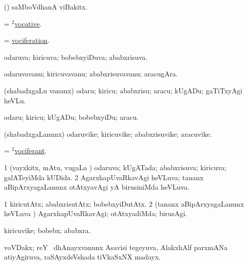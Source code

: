 \bentry 
{} 
\gl{\nA}
\expl{}
\bmng
 (\vAyx) saMboVdhanA viBakitx. 
\emng
\eentry

\bentry 
{}
\gl{\nA}
\expl{}
\bmng
 = \hyperlink{vocative(2)}{$^2$vocative}. 
\emng
\eentry

\bentry
{} 
\gl{\nA}
\expl{}
\bmng
 = \hyperlink{vociferation}{vociferation}. 
\emng
\eentry

\bentry
{} 
\gl{\gu}
\expl{}
\bmng
 odaruva; kiricuva; bobebxyiDuva; ababxrisuva. 
\emng
\eentry

\bentry
{} 
\gl{\nA}
\expl{}
\bmng
 odaruvavanu; kiricuvavanu; ababxrisuvavanu; aracugAra. 
\emng
\eentry

\bentry
{} 
\gl{\sakirx}
\expl{}
\bmng
 (shabadxgaLu \mo vanunx) odaru; kiricu; ababxrisu; aracu; kUgADu; gaTiTxyAgi heVLu. 
\emng

\noindent 
\gl{\akirx}
\expl{}
\bmng
 odaru; kiricu; kUgADu; bobebxyiDu; aracu. 
\emng
\eentry

\bentry 
{} 
\gl{\nA}
\expl{}
\bmng
 (shabadxgaLanunx) odaruvike; kiricuvike; ababxrisuvike; aracuvike. 
\emng
\eentry

\bentry
{} 
\gl{\nA}
\expl{}
\bmng
 = \hyperlink{vociferant(2)}{$^2$vociferant}. 
\emng
\eentry

\bentry
{} 
\gl{\gu}
\expl{}
\bmng
\bnum
\num{1} (vayxkitx, mAtu, \mo vugaLa \vi) odaruva; kUgATada; ababxrisuva; kiricuva; galATeyiMda kUDida. 
\num{2} AgarxhapUvaRkavAgi heVLuva; tananx aBipArxyagaLanunx otAtxyavAgi yA birusiniMda heVLuva. 
\enum
\emng
\eentry

\bentry
{} 
\gl{\kirxvi}
\expl{}
\bmng
\bnum
\num{1} kiricutAtx; ababxrisutAtx; bobebxyiDutAtx. 
\num{2} (tananx aBipArxyagaLanunx heVLuva \vi) AgarxhapUvaRkavAgi; otAtxyadiMda; birusAgi. 
\enum
\emng
\eentry

\bentry 
{} 
\gl{\nA}
\expl{}
\bmng
 kiricuvike; bobebx; ababxra. 
\emng
\eentry

\bentry 
{} 
\gl{\nA}
\expl{}
\bmng
 voVDakx; reY \mo\ dhAnayxvanunx Asavisi tegeyuva, AlakxhAlf parxmANa atiyAgiruva, raSAyxdeVshada tiVkaSxNX madayx. 
\emng
\eentry

